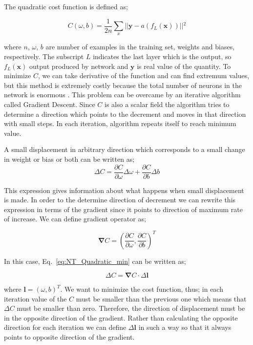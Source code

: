 \documentclass[a4paper,times,hidelinks,12pt]{article}
\begin{document}
The quadratic cost function is defined as;

\begin{equation}
\label{eq:NT_Quadratic}
C(\omega, b) = \frac{1}{2n} \sum\limits_{x} || \boldsymbol{y} - a(f_L(\boldsymbol{x})) ||{^2} 
\end{equation}

\noindent where $n$, $\omega$, $b$ are number of examples in the training set, weights and biases, respectively. The subscript $L$ indicates the last layer which is the output, so $f_L(\boldsymbol{x})$ output produced by network and $\boldsymbol{y}$ is real value of the quantity. To minimize $C$, we can take derivative of the function and can find extremum values, but this method is extremely costly because the total number of neurons in the network is enormous \cite{nielsen2015neural}. This problem can be overcame by an iterative algorithm called Gradient Descent. Since $C$ is also a scalar field the algorithm tries to determine a direction which points to the decrement and moves in that direction with small steps. In each iteration, algorithm repeats itself to reach minimum value. 

A small displacement in arbitrary direction which corresponds to a small change in weight or bias or both can be written as;
\begin{equation}
\label{eq:NT_Quadratic_min}
\Delta{C} = \frac{\partial{C}}{\partial{\omega}}\Delta{\omega} + \frac{\partial{C}}{\partial{b}}\Delta{b}
\end{equation}

\noindent This expression gives information about what happens when small displacement is made. In order to the determine direction of decrement we can rewrite this expression in terms of the gradient since it points to direction of maximum rate of increase. We can define gradient operator as;

\begin{equation}
\label{eq:gradient}
\boldsymbol{\nabla}{C} = \left(\frac{\partial{C}}{\partial{\omega}},\frac{\partial{C}}{\partial{b}} \right)^T
\end{equation}

\noindent In this case, Eq.~\eqref{eq:NT_Quadratic_min} can be written as;

\begin{equation}
\label{eq:NT_Quadratic_min_gradient_form}
\Delta{C} = \boldsymbol{\nabla}{C} \cdot \Delta \boldsymbol{l}
\end{equation}

\noindent where $\boldsymbol{l} = (\omega, b)^T$. We want to minimize the cost function, thus; in each iteration value of the $C$ must be smaller than the previous one which means that $\Delta{C}$ must be smaller than zero. Therefore, the direction of displacement must be in the opposite direction of the gradient. Rather than calculating the opposite direction for each iteration we can define $\Delta{\boldsymbol{l}}$ in such a way so that it always points to opposite direction of the gradient.
\end{document}
